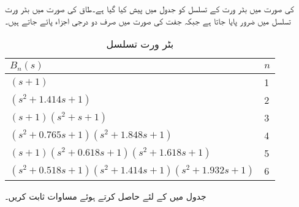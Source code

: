  کی صورت میں بٹر ورت کے تسلسل کو جدول  میں پیش کیا گیا ہے۔طاق  کی صورت میں بٹر ورت تسلسل میں  ضرور پایا جاتا ہے جبکہ جفت  کی صورت میں صرف  دو درجی اجزاء پائے جاتے ہیں۔
 
\begin{table}
\caption{بٹر ورت تسلسل}
\label{جدول_تعددی_ردعمل_بٹرورت_قلیات}
\centering
\begin{tabular}{l l}
\toprule
$B_n(s)$&$n$\\
\midrule
$\left(s+1 \right) $ &1\\
$ \left(s^2+1.414s+1 \right)$&2\\
$\left(s+1\right)\left(s^2+s+1 \right)$ &3\\
$\left(s^2+0.765s+1\right)\left(s^2+1.848s+1\right)$&4\\
$\left(s+1\right)\left(s^2+0.618s+1\right)\left(s^2+1.618s+1\right)$&5\\
$\left(s^2+0.518s+1 \right)\left(s^2+1.414s+1\right)\left(s^2+1.932s+1\right)$&6\\
\bottomrule
\end{tabular}
\end{table}
%
جدول  میں  کے لئے  حاصل کرتے ہوئے مساوات  ثابت کریں۔

